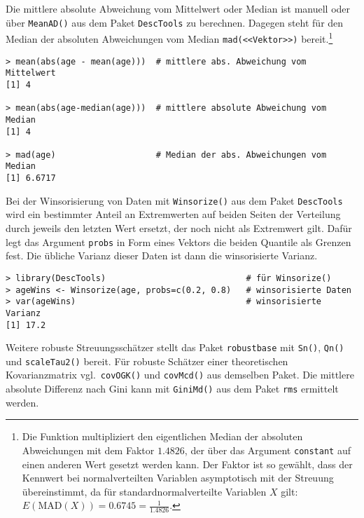 Die mittlere absolute Abweichung vom Mittelwert oder Median ist manuell oder über \lstinline!MeanAD()! aus dem Paket \lstinline!DescTools! zu berechnen. Dagegen steht für den Median der absoluten Abweichungen vom Median \lstinline!mad(<<Vektor>>)! bereit.\footnote{Die Funktion multipliziert den eigentlichen Median der absoluten Abweichungen mit dem Faktor $1.4826$, der über das Argument \lstinline!constant! auf einen anderen Wert gesetzt werden kann. Der Faktor ist so gewählt, dass der Kennwert bei normalverteilten Variablen asymptotisch mit der Streuung übereinstimmt, da für standardnormalverteilte Variablen $X$ gilt: $E(\text{MAD}(X)) = 0.6745 = \frac{1}{1.4826}$.}
\begin{lstlisting}
> mean(abs(age - mean(age)))  # mittlere abs. Abweichung vom Mittelwert
[1] 4

> mean(abs(age-median(age)))  # mittlere absolute Abweichung vom Median
[1] 4

> mad(age)                    # Median der abs. Abweichungen vom Median
[1] 6.6717
\end{lstlisting}

Bei der Winsorisierung von Daten mit \lstinline!Winsorize()! aus dem Paket \lstinline!DescTools! wird ein bestimmter Anteil an Extremwerten auf beiden Seiten der Verteilung durch jeweils den letzten Wert ersetzt, der noch nicht als Extremwert gilt. Dafür legt das Argument \lstinline!probs! in Form eines Vektors die beiden Quantile als Grenzen fest. Die übliche Varianz dieser Daten ist dann die winsorisierte Varianz.
\begin{lstlisting}
> library(DescTools)                            # für Winsorize()
> ageWins <- Winsorize(age, probs=c(0.2, 0.8)   # winsorisierte Daten
> var(ageWins)                                  # winsorisierte Varianz
[1] 17.2
\end{lstlisting}

Weitere robuste Streuungsschätzer stellt das Paket \lstinline!robustbase! mit  \lstinline!Sn()!,  \lstinline!Qn()! und  \lstinline!scaleTau2()! bereit. Für robuste Schätzer einer theoretischen Kovarianzmatrix vgl.\ \lstinline!covOGK()! und \lstinline!covMcd()! aus demselben Paket. Die mittlere absolute Differenz nach Gini kann mit  \lstinline!GiniMd()! aus dem Paket \lstinline!rms! \cite{HarrellJr2009} ermittelt werden.

